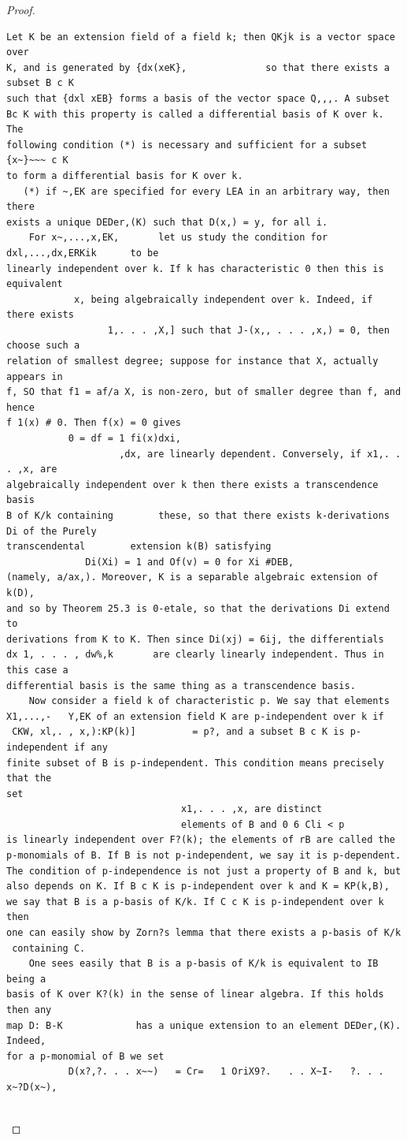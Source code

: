 \begin{proof}
\begin{verbatim}
Let K be an extension field of a field k; then QKjk is a vector space over
K, and is generated by {dx(xeK},              so that there exists a subset B c K
such that {dxl xEB} forms a basis of the vector space Q,,,. A subset
Bc K with this property is called a differential basis of K over k. The
following condition (*) is necessary and sufficient for a subset {x~}~~~ c K
to form a differential basis for K over k.
   (*) if ~,EK are specified for every LEA in an arbitrary way, then there
exists a unique DEDer,(K) such that D(x,) = y, for all i.
    For x~,...,x,EK,       let us study the condition for dxl,...,dx,ERKik      to be
linearly independent over k. If k has characteristic 0 then this is equivalent
            x, being algebraically independent over k. Indeed, if there exists
                  1,. . . ,X,] such that J-(x,, . . . ,x,) = 0, then choose such a
relation of smallest degree; suppose for instance that X, actually appears in
f, SO that f1 = af/a X, is non-zero, but of smaller degree than f, and hence
f 1(x) # 0. Then f(x) = 0 gives
           0 = df = 1 fi(x)dxi,
                    ,dx, are linearly dependent. Conversely, if x1,. . . ,x, are
algebraically independent over k then there exists a transcendence basis
B of K/k containing        these, so that there exists k-derivations Di of the Purely
transcendental        extension k(B) satisfying
              Di(Xi) = 1 and Of(v) = 0 for Xi #DEB,
(namely, a/ax,). Moreover, K is a separable algebraic extension of k(D),
and so by Theorem 25.3 is 0-etale, so that the derivations Di extend to
derivations from K to K. Then since Di(xj) = 6ij, the differentials
dx 1, . . . , dw%,k       are clearly linearly independent. Thus in this case a
differential basis is the same thing as a transcendence basis.
    Now consider a field k of characteristic p. We say that elements
X1,...,-   Y,EK of an extension field K are p-independent over k if
 CKW, xl,. , x,):KP(k)]          = p?, and a subset B c K is p-independent if any
finite subset of B is p-independent. This condition means precisely that the
set
                               x1,. . . ,x, are distinct
                               elements of B and 0 6 Cli < p
is linearly independent over F?(k); the elements of rB are called the
p-monomials of B. If B is not p-independent, we say it is p-dependent.
The condition of p-independence is not just a property of B and k, but
also depends on K. If B c K is p-independent over k and K = KP(k,B),
we say that B is a p-basis of K/k. If C c K is p-independent over k then
one can easily show by Zorn?s lemma that there exists a p-basis of K/k
 containing C.
    One sees easily that B is a p-basis of K/k is equivalent to IB being a
basis of K over K?(k) in the sense of linear algebra. If this holds then any
map D: B-K             has a unique extension to an element DEDer,(K). Indeed,
for a p-monomial of B we set
           D(x?,?. . . x~~)   = Cr=   1 OriX9?.   . . X~I-   ?. . . x~?D(x~),


\end{verbatim}
\end{proof}
